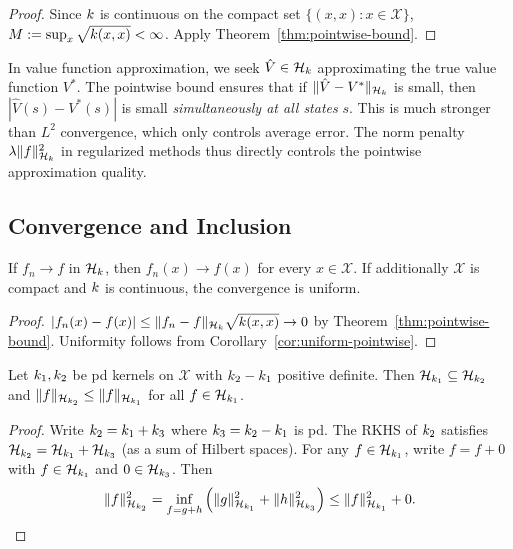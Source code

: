 \documentclass[11pt,a4paper]{article}
\begin{document}
\begin{proof}
Since $k$ is continuous on the compact set $\{(x,x) :
x \in \mathcal{X}\}$, $M := \sup_x \sqrt{k(x,x)} <
\infty$. Apply Theorem~\ref{thm:pointwise-bound}.
\end{proof}

\begin{rlconnection}[title={Norm Control in Function Approximation}]
In value function approximation, we seek $\hat{V} \in \mathcal{H}_k$
approximating the true value function $V^*$. The pointwise bound
ensures that if $\|\hat{V} - V^*\|_{\mathcal{H}_k}$ is small, then
$|\hat{V}(s) - V^*(s)|$ is small \emph{simultaneously at all
states} $s$. This is much stronger than $L^2$ convergence, which
only controls average error. The norm penalty $\lambda \|f\|_{\mathcal{H}_k}^2$
in regularized methods thus directly controls the pointwise
approximation quality.
\end{rlconnection}

\subsection{Convergence and Inclusion}

\begin{proposition}
\label{prop:rkhs-pointwise-convergence}
If $f_n \to f$ in $\mathcal{H}_k$, then $f_n(x) \to f(x)$ for every
$x \in \mathcal{X}$. If additionally $\mathcal{X}$ is compact
and $k$ is continuous, the convergence is uniform.
\end{proposition}

\begin{proof}
$|f_n(x) - f(x)| \le \|f_n - f\|_{\mathcal{H}_k} \sqrt{k(x, x)}
\to 0$ by Theorem~\ref{thm:pointwise-bound}. Uniformity follows
from Corollary~\ref{cor:uniform-pointwise}.
\end{proof}

\begin{theorem}
\label{thm:rkhs-inclusion}
Let $k_1, k_2$ be pd kernels on $\mathcal{X}$ with
$k_2 - k_1$ positive definite. Then
$\mathcal{H}_{k_1} \subseteq \mathcal{H}_{k_2}$
and $\|f\|_{\mathcal{H}_{k_2}} \le \|f\|_{\mathcal{H}_{k_1}}$
for all $f \in \mathcal{H}_{k_1}$.
\end{theorem}

\begin{proof}
Write $k_2 = k_1 + k_3$ where $k_3 =
k_2 - k_1$ is pd. The RKHS of $k_2$ satisfies
$\mathcal{H}_{k_2} = \mathcal{H}_{k_1} +
\mathcal{H}_{k_3}$ (as a sum of Hilbert spaces). For any
$f \in \mathcal{H}_{k_1}$, write $f = f + 0$ with $f \in
\mathcal{H}_{k_1}$ and $0 \in \mathcal{H}_{k_3}$.
Then
\[
\|f\|_{\mathcal{H}_{k_2}}^2
= \inf_{f = g + h} \left(\|g\|_{\mathcal{H}_{k_1}}^2
+ \|h\|_{\mathcal{H}_{k_3}}^2\right)
\le \|f\|_{\mathcal{H}_{k_1}}^2 + 0.
\qedhere
\]
\end{proof}
\end{document}
